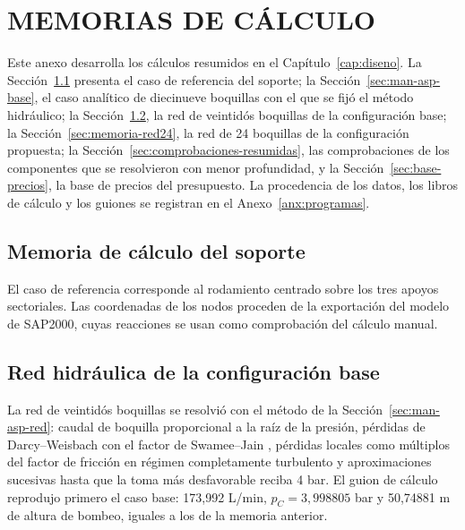 \chapter{MEMORIAS DE CÁLCULO}
\label{anx:calculos}

Este anexo desarrolla los cálculos resumidos en el Capítulo~\ref{cap:diseno}. La Sección~\ref{sec:memoria-soporte} presenta el caso de referencia del soporte; la Sección~\ref{sec:man-asp-base}, el caso analítico de diecinueve boquillas con el que se fijó el método hidráulico; la Sección~\ref{sec:memoria-red22}, la red de veintidós boquillas de la configuración base; la Sección~\ref{sec:memoria-red24}, la red de 24 boquillas de la configuración propuesta; la Sección~\ref{sec:comprobaciones-resumidas}, las comprobaciones de los componentes que se resolvieron con menor profundidad, y la Sección~\ref{sec:base-precios}, la base de precios del presupuesto. La procedencia de los datos, los libros de cálculo y los guiones se registran en el Anexo~\ref{anx:programas}.

\section{Memoria de cálculo del soporte}
\label{sec:memoria-soporte}

El caso de referencia corresponde al rodamiento centrado sobre los tres apoyos sectoriales. Las coordenadas de los nodos proceden de la exportación del modelo de SAP2000, cuyas reacciones se usan como comprobación del cálculo manual.







\section{Red hidráulica de la configuración base}
\label{sec:memoria-red22}

La red de veintidós boquillas se resolvió con el método de la Sección~\ref{sec:man-asp-red}: caudal de boquilla proporcional a la raíz de la presión, pérdidas de Darcy--Weisbach con el factor de Swamee--Jain \cite{manSwamee}, pérdidas locales como múltiplos del factor de fricción en régimen completamente turbulento \cite{crane410} y aproximaciones sucesivas hasta que la toma más desfavorable reciba 4 bar. El guion de cálculo reprodujo primero el caso base: 173,992 L/min, $p_C=3{,}998805$ bar y 50,74881 m de altura de bombeo, iguales a los de la memoria anterior.

